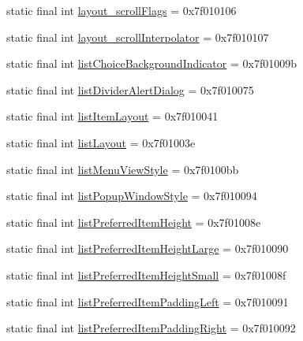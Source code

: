 \begin{CompactItemize}
\item 
static final int \hyperlink{classandroid_1_1support_1_1mediacompat_1_1_r_1_1attr_50e7250c21b50a9dfc5b626f9de5aec4}{layout\_\-scrollFlags} = 0x7f010106
\item 
static final int \hyperlink{classandroid_1_1support_1_1mediacompat_1_1_r_1_1attr_1ff8cb20162c6bf645ffc7274f80a710}{layout\_\-scrollInterpolator} = 0x7f010107
\item 
static final int \hyperlink{classandroid_1_1support_1_1mediacompat_1_1_r_1_1attr_fa1229d90aeffd77757f9878cb8be086}{listChoiceBackgroundIndicator} = 0x7f01009b
\item 
static final int \hyperlink{classandroid_1_1support_1_1mediacompat_1_1_r_1_1attr_ed55716060ca762254b9c6e39a37a392}{listDividerAlertDialog} = 0x7f010075
\item 
static final int \hyperlink{classandroid_1_1support_1_1mediacompat_1_1_r_1_1attr_53d1b5cf7893562d845823091314ac5c}{listItemLayout} = 0x7f010041
\item 
static final int \hyperlink{classandroid_1_1support_1_1mediacompat_1_1_r_1_1attr_786d3d808a38c3da7e3f411be38cb65b}{listLayout} = 0x7f01003e
\item 
static final int \hyperlink{classandroid_1_1support_1_1mediacompat_1_1_r_1_1attr_f4033cb0696a2d2fcf09168142dbdf19}{listMenuViewStyle} = 0x7f0100bb
\item 
static final int \hyperlink{classandroid_1_1support_1_1mediacompat_1_1_r_1_1attr_9409b80e97559eb89ba6a5f9c47073dd}{listPopupWindowStyle} = 0x7f010094
\item 
static final int \hyperlink{classandroid_1_1support_1_1mediacompat_1_1_r_1_1attr_583a2f8303d9e545e1a1a49adf2d3328}{listPreferredItemHeight} = 0x7f01008e
\item 
static final int \hyperlink{classandroid_1_1support_1_1mediacompat_1_1_r_1_1attr_a8ace72ca6f0a8415ddebfac0ee49b77}{listPreferredItemHeightLarge} = 0x7f010090
\item 
static final int \hyperlink{classandroid_1_1support_1_1mediacompat_1_1_r_1_1attr_767596060df9a101da530b8031a25f57}{listPreferredItemHeightSmall} = 0x7f01008f
\item 
static final int \hyperlink{classandroid_1_1support_1_1mediacompat_1_1_r_1_1attr_b0f29113ba3afabbb8dcb957b843d4aa}{listPreferredItemPaddingLeft} = 0x7f010091
\item 
static final int \hyperlink{classandroid_1_1support_1_1mediacompat_1_1_r_1_1attr_a6b48d415f9cfbd77ea2587ff14ed6cc}{listPreferredItemPaddingRight} = 0x7f010092
\item 

\end{CompactItemize}
